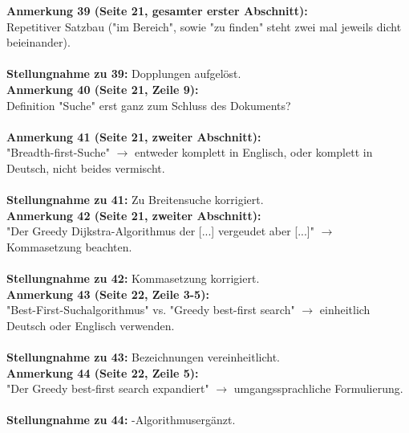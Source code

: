 \documentclass[a4paper,12pt]{book}
\begin{document}
\noindent
\textbf{Anmerkung 39 (Seite 21, gesamter erster Abschnitt):}\\
Repetitiver Satzbau ("im Bereich", sowie "zu finden" steht zwei mal jeweils dicht beieinander). \\
\\
\textbf{Stellungnahme zu 39:}
Dopplungen aufgelöst.
\\

\noindent
\textbf{Anmerkung 40 (Seite 21, Zeile 9):}\\
Definition "Suche" erst ganz zum Schluss des Dokuments? \\
\\

\noindent
\textbf{Anmerkung 41 (Seite 21, zweiter Abschnitt):}\\
"Breadth-first-Suche" $\rightarrow$ entweder komplett in Englisch, oder komplett in Deutsch, nicht beides vermischt. \\
\\
\textbf{Stellungnahme zu 41:}
Zu \glqq Breitensuche \grqq korrigiert.
\\

\noindent
\textbf{Anmerkung 42 (Seite 21, zweiter Abschnitt):}\\
"Der Greedy Dijkstra-Algorithmus der [...] vergeudet aber [...]" $\rightarrow$ Kommasetzung beachten. \\
\\
\textbf{Stellungnahme zu 42:}
Kommasetzung korrigiert.
\\

\noindent
\textbf{Anmerkung 43 (Seite 22, Zeile 3-5):}\\
"Best-First-Suchalgorithmus" vs. "Greedy best-first search" $\rightarrow$ einheitlich Deutsch oder Englisch verwenden. \\
\\
\textbf{Stellungnahme zu 43:}
Bezeichnungen vereinheitlicht.
\\

\noindent
\textbf{Anmerkung 44 (Seite 22, Zeile 5):}\\
"Der Greedy best-first search expandiert" $\rightarrow$ umgangssprachliche Formulierung. \\
\\
\textbf{Stellungnahme zu 44:}
\glqq-Algorithmus\grqq ergänzt.
\\
\end{document}
